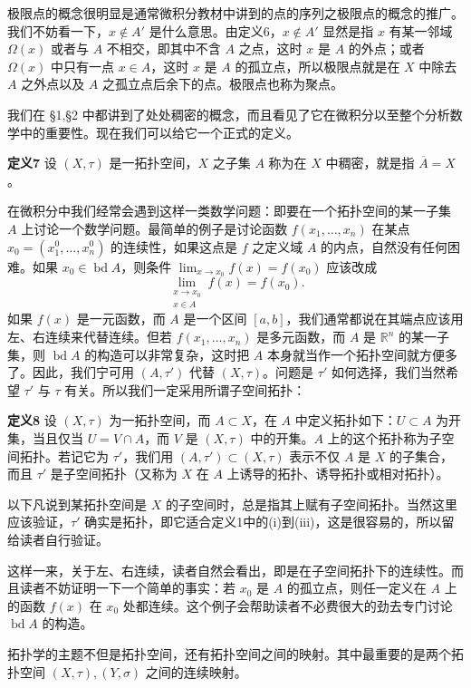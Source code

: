 极限点的概念很明显是通常微积分教材中讲到的点的序列之极限点的概念的推广。我们不妨看一下，$x\notin A'$ 是什么意思。由定义6，$x\notin A'$ 显然是指 $x$ 有某一邻域 $\Omega(x)$ 或者与 $A$ 不相交，即其中不含 $A$ 之点，这时 $x$ 是 $A$ 的外点；或者 $\Omega(x)$ 中只有一点 $x\in A$，这时 $x$ 是 $A$ 的孤立点，所以极限点就是在 $X$ 中除去 $A$ 之外点以及 $A$ 之孤立点后余下的点。极限点也称为聚点。

我们在 \S1,\S2 中都讲到了处处稠密的概念，而且看见了它在微积分以至整个分析数学中的重要性。现在我们可以给它一个正式的定义。

\noindent\textbf{定义7}\quad
设 $(X,\tau)$ 是一拓扑空间，$X$ 之子集 $A$ 称为在 $X$ 中稠密，就是指 $\overline A=X$。

在微积分中我们经常会遇到这样一类数学问题：即要在一个拓扑空间的某一子集 $A$ 上讨论一个数学问题。最简单的例子是讨论函数 $f(x_1,\ldots,x_n)$ 在某点 $x_0=(x_1^0,\ldots,x_n^0)$ 的连续性，如果这点是 $f$ 之定义域 $A$ 的内点，自然没有任何困难。如果 $x_0\in\operatorname{bd}A$，则条件 $\lim_{x\to x_0}f(x)=f(x_0)$ 应该改成
\[
 \lim_{\substack{x\to x_0\\x\in A}}f(x)=f(x_0).
\]
如果 $f(x)$ 是一元函数，而 $A$ 是一个区间 $[a,b]$，我们通常都说在其端点应该用左、右连续来代替连续。但若 $f(x_1,\ldots,x_n)$ 是多元函数，而 $A$ 是 $\mathbb R^n$ 的某一子集，则 $\operatorname{bd}A$ 的构造可以非常复杂，这时把 $A$ 本身就当作一个拓扑空间就方便多了。因此，我们宁可用 $(A,\tau')$ 代替 $(X,\tau)$。问题是 $\tau'$ 如何选择，我们当然希望 $\tau'$ 与 $\tau$ 有关。所以我们一定采用所谓子空间拓扑：

\noindent\textbf{定义8}\quad
设 $(X,\tau)$ 为一拓扑空间，而 $A\subset X$，在 $A$ 中定义拓扑如下：$U\subset A$ 为开集，当且仅当 $U=V\cap A$，而 $V$ 是 $(X,\tau)$ 中的开集。$A$ 上的这个拓扑称为子空间拓扑。若记它为 $\tau'$，我们用 $(A,\tau')\subset(X,\tau)$ 表示不仅 $A$ 是 $X$ 的子集合，而且 $\tau'$ 是子空间拓扑（又称为 $X$ 在 $A$ 上诱导的拓扑、诱导拓扑或相对拓扑）。

以下凡说到某拓扑空间是 $X$ 的子空间时，总是指其上赋有子空间拓扑。当然这里应该验证，$\tau'$ 确实是拓扑，即它适合定义1中的(i)到(iii)，这是很容易的，所以留给读者自行验证。

这样一来，关于左、右连续，读者自然会看出，即是在子空间拓扑下的连续性。而且读者不妨证明一下一个简单的事实：若 $x_0$ 是 $A$ 的孤立点，则任一定义在 $A$ 上的函数 $f(x)$ 在 $x_0$ 处都连续。这个例子会帮助读者不必费很大的劲去专门讨论 $\operatorname{bd}A$ 的构造。

拓扑学的主题不但是拓扑空间，还有拓扑空间之间的映射。其中最重要的是两个拓扑空间 $(X,\tau),(Y,\sigma)$ 之间的连续映射。

